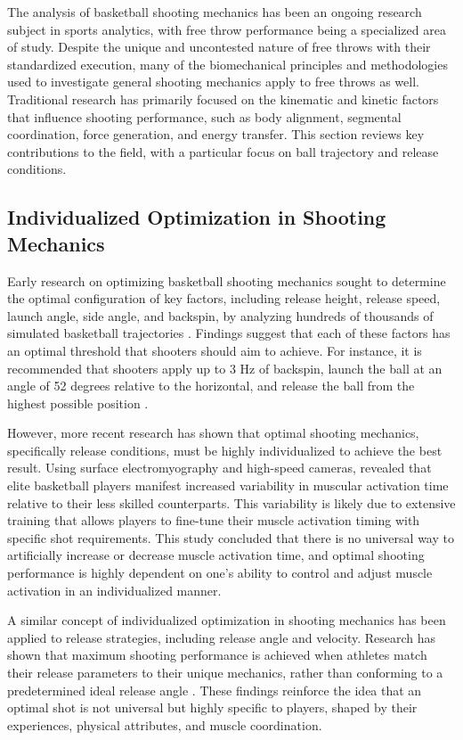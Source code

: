 \documentclass[Review,sageh,times,doublespace]{sagej}
\begin{document}
    The analysis of basketball shooting mechanics has been an ongoing research subject in sports analytics, with free throw performance being a specialized area of study. Despite the unique and uncontested nature of free throws with their standardized execution, many of the biomechanical principles and methodologies used to investigate general shooting mechanics apply to free throws as well. Traditional research has primarily focused on the kinematic and kinetic factors that influence shooting performance, such as body alignment, segmental coordination, force generation, and energy transfer. This section reviews key contributions to the field, with a particular focus on ball trajectory and release conditions.

    \subsection{Individualized Optimization in Shooting Mechanics}

      Early research on optimizing basketball shooting mechanics sought to determine the optimal configuration of key factors, including release height, release speed, launch angle, side angle, and backspin, by analyzing hundreds of thousands of simulated basketball trajectories \citep{tran_optimal_2008}. Findings suggest that each of these factors has an optimal threshold that shooters should aim to achieve. For instance, it is recommended that shooters apply up to 3 Hz of backspin, launch the ball at an angle of 52 degrees relative to the horizontal, and release the ball from the highest possible position \citep{tran_optimal_2008}.

      However, more recent research has shown that optimal shooting mechanics, specifically release conditions, must be highly individualized to achieve the best result. Using surface electromyography and high-speed cameras, \citet{pakosz_muscle_2021} revealed that elite basketball players manifest increased variability in muscular activation time relative to their less skilled counterparts. This variability is likely due to extensive training that allows players to fine-tune their muscle activation timing with specific shot requirements. This study concluded that there is no universal way to artificially increase or decrease muscle activation time, and optimal shooting performance is highly dependent on one's ability to control and adjust muscle activation in an individualized manner. 

      A similar concept of individualized optimization in shooting mechanics has been applied to release strategies, including release angle and velocity. Research has shown that maximum shooting performance is achieved when athletes match their release parameters to their unique mechanics, rather than conforming to a predetermined ideal release angle \citep{slegers_basketball_2022}. These findings reinforce the idea that an optimal shot is not universal but highly specific to players, shaped by their experiences, physical attributes, and muscle coordination. 
\end{document}
